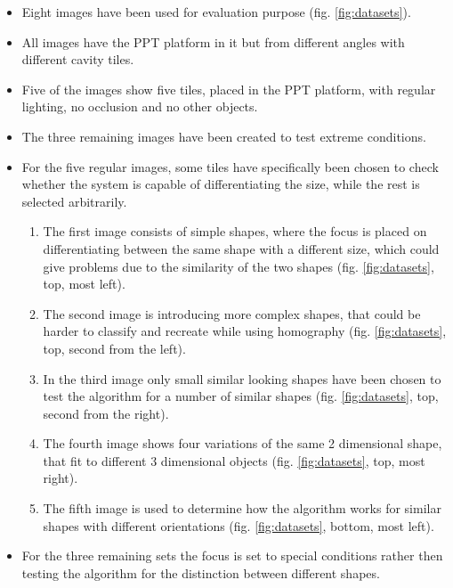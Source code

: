 \documentclass{article}
\begin{document}
\begin{itemize}
\item Eight images have been used for evaluation purpose (fig. \ref{fig:datasets}).
\item All images have the PPT platform in it but from different angles with different cavity tiles.
\item Five of the images show five tiles, placed in the PPT platform, with regular lighting, no occlusion and no other objects.
 \item The three remaining images have been created to test extreme conditions.
\item For the five regular images, some tiles have specifically been chosen to check whether the system is capable of differentiating the size, while the rest is selected arbitrarily.
\begin{enumerate}
\item The first image consists of simple shapes, where the focus is placed on differentiating between the same shape with a different size, which could give problems due to the similarity of the two shapes (fig. \ref{fig:datasets}, top, most left).
\item The second image is introducing more complex shapes, that could be harder to classify and recreate while using homography (fig. \ref{fig:datasets}, top, second from the left).
\item In the third image only small similar looking shapes have been chosen to test the algorithm for a number of similar shapes (fig. \ref{fig:datasets}, top, second from the right).
\item The fourth image shows four variations of the same 2 dimensional shape, that fit to different 3 dimensional objects (fig. \ref{fig:datasets}, top, most right).
\item The fifth image is used to determine how the algorithm works for similar shapes with different orientations (fig. \ref{fig:datasets}, bottom, most left).
\end{enumerate}
\item For the three remaining sets the focus is set to special conditions rather then testing the algorithm for the distinction between different shapes.
\begin{enumerate}


\end{enumerate}
\end{itemize}
\end{document}
